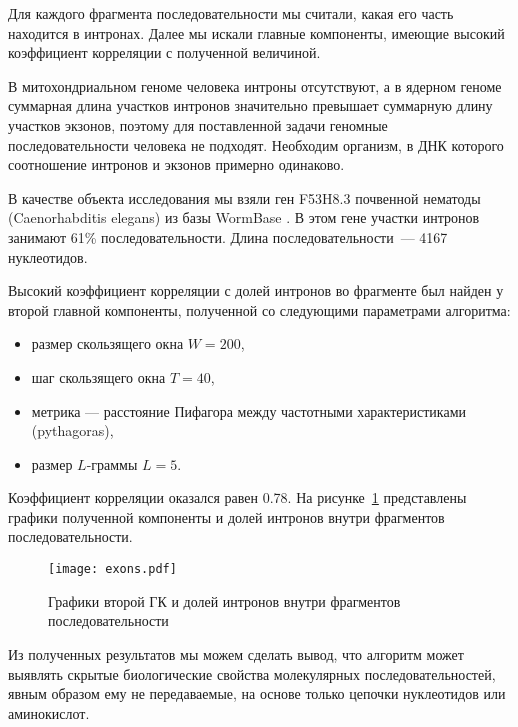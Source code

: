 Для каждого фрагмента последовательности мы считали, какая его часть находится в интронах. Далее мы искали главные компоненты, имеющие высокий коэффициент корреляции с полученной величиной.

В митохондриальном геноме человека интроны отсутствуют, а в ядерном геноме суммарная длина участков интронов значительно превышает суммарную длину участков экзонов, поэтому для поставленной задачи геномные последовательности человека не подходят. Необходим организм, в ДНК которого соотношение интронов и экзонов примерно одинаково.

В качестве объекта исследования мы взяли ген F53H8.3 почвенной нематоды (Caenorhabditis elegans) из базы WormBase \cite{Harris2003}. В этом гене участки интронов занимают 61\% последовательности. Длина последовательности~--- 4167 нуклеотидов.

Высокий коэффициент корреляции с долей интронов во фрагменте был найден у второй главной компоненты, полученной со следующими параметрами алгоритма:

\begin{itemize}
  \item размер скользящего окна $W = 200$,
  \item шаг скользящего окна $T = 40$,
  \item метрика --- расстояние Пифагора между частотными характеристиками (pythagoras),
  \item размер $L$-граммы $L = 5$.
\end{itemize}

Коэффициент корреляции оказался равен 0.78. На рисунке~\ref{exons} представлены графики полученной компоненты и долей интронов внутри фрагментов последовательности.

\begin{figure}[h]
  \centering
  \texttt{[image: exons.pdf]}
  \caption{Графики второй ГК и долей интронов внутри фрагментов последовательности}
  \label{exons}
\end{figure}

Из полученных результатов мы можем сделать вывод, что алгоритм может выявлять скрытые биологические свойства молекулярных последовательностей, явным образом ему не передаваемые, на основе только цепочки нуклеотидов или аминокислот.
